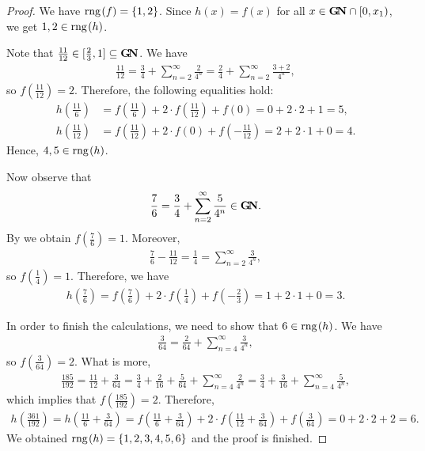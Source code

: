 \documentclass{amsart}
\theoremstyle{definition}
\newcommand{\rng}{{\rm rng} \hspace{0.03cm}}
\newcommand{\GN}{\mathbf{G}\hspace{-0.07cm}\mathbf{N}}
\begin{document}
\begin{proof}
We have $\rng(f)=\{1,2\}$. Since $h(x)=f(x)$ for all $x\in \GN\cap[0,x_1)$, we get $1,2\in \rng(h)$.

Note that $\frac{11}{12}\in [\frac{2}{3},1]\subseteq \GN$. We have
\begin{align*}
\frac{11}{12}=\frac{3}{4}+\sum_{n=2}^{\infty}\frac{2}{4^n}=\frac{2}{4}+\sum_{n=2}^{\infty}\frac{3+2}{4^n},
\end{align*}
so $f(\frac{11}{12})=2$. Therefore, the following equalities hold:
\begin{align*}
h\left(\frac{11}{6}\right) & = f\left(\frac{11}{6}\right)+2\cdot f\left(\frac{11}{12}\right)+f(0)=0+2\cdot 2+1=5, \\
h\left(\frac{11}{12}\right) & =f\left(\frac{11}{12}\right)+2\cdot f(0)+f\left(-\frac{11}{12}\right)=2+2\cdot 1+0=4.
\end{align*}
Hence, $4,5\in \rng (h)$. 

Now observe that
\begin{align*}
\frac{7}{6}=\frac{3}{4}+\sum_{n=2}^{\infty}\frac{5}{4^n}\in \GN.
\end{align*}
By \cite[Theorem 6.1]{BPW} we obtain $f\left(\frac{7}{6}\right)=1$. Moreover, 
\begin{align*}
\frac{7}{6}-\frac{11}{12}=\frac{1}{4}=\sum_{n=2}^{\infty}\frac{3}{4^n},
\end{align*}
so $f\left(\frac{1}{4}\right)=1$. Therefore, we have 
\begin{align*}
h\left(\frac{7}{6}\right)=f\left(\frac{7}{6}\right)+2\cdot f\left(\frac{1}{4}\right)+f\left(-\frac{2}{3}\right)=1+2\cdot 1 + 0 = 3.
\end{align*} 

In order to finish the calculations, we need to show that $6\in \rng (h)$. %
We have 
\begin{align*}
\frac{3}{64}=\frac{2}{64}+\sum_{n=4}^{\infty}\frac{3}{4^n},
\end{align*}
so $f\left(\frac{3}{64}\right)=2$. What is more, 
\begin{align*}
\frac{185}{192}=\frac{11}{12}+\frac{3}{64}=\frac{3}{4}+\frac{2}{16}+\frac{5}{64}+\sum_{n=4}^{\infty}\frac{2}{4^n}=\frac{3}{4}+\frac{3}{16}+\sum_{n=4}^{\infty}\frac{5}{4^n},
\end{align*}
which implies that $f\left(\frac{185}{192}\right)=2$. Therefore,
\begin{align*}
h\left(\frac{361}{192}\right)=h\left(\frac{11}{6}+\frac{3}{64}\right)=f\left(\frac{11}{6}+\frac{3}{64}\right)+2\cdot f\left(\frac{11}{12}+\frac{3}{64}\right)+f\left(\frac{3}{64}\right)=0+2\cdot 2+2=6.
\end{align*}
We obtained $\rng (h)=\{1,2,3,4,5,6\}$ and the proof is finished.
\end{proof}
\end{document}
